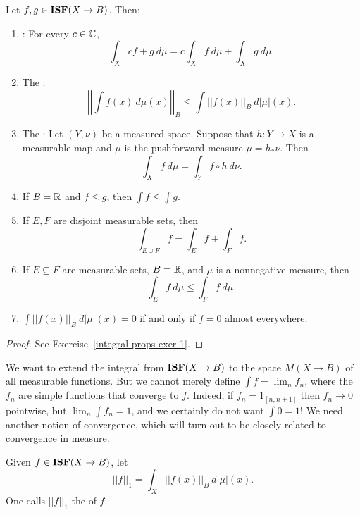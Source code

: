 \begin{lemma}
\label{properties of ISF integral}
Let $f,g \in \mathbf{ISF}(X \to B)$. Then:
\begin{enumerate}
\item {}: For every $c \in \mathbb{C}$,
\[\int_{X} cf + g~d\mu = c\int_{X} f ~d\mu + \int_{X} g~d\mu.\]
\item The :
\[\left|\left|\int f(x) ~d\mu(x)\right|\right|_{B} \leq \int ||f(x)||_{B} ~d|\mu|(x).\]
\item The : Let $(Y, \nu)$ be a measured space. Suppose that $h: Y \to X$ is a measurable map and $\mu$ is the pushforward measure $\mu = h_*\nu$. Then
\[\int_{X} f~d\mu = \int_{Y} f \circ h~d\nu.\]
\item If $B = \mathbb{R}$ and $f \leq g$, then $\int f \leq \int g$.
\item If $E,F$ are disjoint measurable sets, then
\[\int_{E \cup F} f = \int_{E} f + \int_{F} f.\]
\item If $E \subseteq F$ are measurable sets, $B = \mathbb{R}$, and $\mu$ is a nonnegative measure, then
\[\int_{E} f~d\mu \leq \int_{F} f~d\mu.\]
\item $\int ||f(x)||_{B} ~d|\mu|(x) = 0$ if and only if $f = 0$ almost everywhere.
\end{enumerate}
\end{lemma}
\begin{proof}
See Exercise~\ref{integral props exer 1}.
\end{proof}

\begin{subsec}
We want to extend the integral from $\mathbf{ISF}(X \to B)$ to the space $M(X \to B)$ of all measurable functions.
But we cannot merely define $\int f = \lim_{n} f_{n}$, where the $f_{n}$ are simple functions that converge to $f$.
Indeed, if $f_{n} = 1_{[n, n+1]}$ then $f_{n} \to 0$ pointwise, but $\lim_{n} \int f_{n} = 1$, and we certainly do not want $\int 0 = 1$!
We need another notion of convergence, which will turn out to be closely related to convergence in measure.
\end{subsec}

\begin{definition}
Given $f \in \mathbf{ISF}(X \to B)$, let
\begin{equation}
\label{L1 norm dfn}
||f||_1 = \int_{X} ||f(x)||_{B} ~d|\mu|(x).
\end{equation}
One calls $||f||_1$ the  of $f$.
\end{definition}

